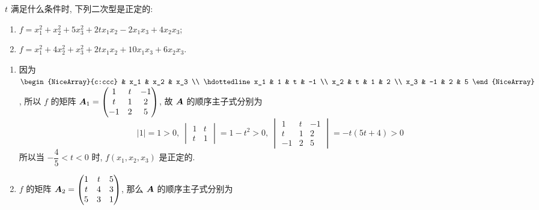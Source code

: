 \begin{example}
    $t$ 满足什么条件时, 下列二次型是正定的:
    \begin{enumerate}[label=(\arabic{*})]
        \item $f=x_1^2+x_2^2+5x_3^2+2tx_1x_2-2x_1x_3+4x_2x_3$;
        \item $f=x_1^2+4x_2^2+x_3^2+2tx_1x_2+10x_1x_3+6x_2x_3$.
    \end{enumerate}
\end{example}
\begin{solution}
    \begin{enumerate}[label=(\arabic{*})]
        \item 因为 $\begin{NiceArray}{c:ccc}
            & x_1 & x_2 & x_3 \\ \hdottedline
                          x_1 & 1   & t   & -1  \\
                          x_2 & t   & 1   & 2   \\
                          x_3 & -1  & 2   & 5
        \end{NiceArray}$, 所以 $f$ 的矩阵 $\vb*{A}_1=\begin{pmatrix}
                      1  & t & -1 \\
                      t  & 1 & 2  \\
                      -1 & 2 & 5
                  \end{pmatrix}$, 故 $\vb*{A}$ 的顺序主子式分别为
              $$|1|=1>0,~\begin{vmatrix}
                      1 & t \\
                      t & 1
                  \end{vmatrix}=1-t^2>0,~\begin{vmatrix}
                      1  & t & -1 \\
                      t  & 1 & 2  \\
                      -1 & 2 & 5
                  \end{vmatrix}=-t(5t+4)>0$$
              所以当 $-\dfrac{4}{5}<t<0$ 时, $f(x_1,x_2,x_3)$ 是正定的.
        \item $f$ 的矩阵 $\vb*{A}_2=\begin{pmatrix}
                      1 & t & 5 \\
                      t & 4 & 3 \\
                      5 & 3 & 1
                  \end{pmatrix}$, 那么 $\vb*{A}$ 的顺序主子式分别为

\end{enumerate}
\end{solution}
